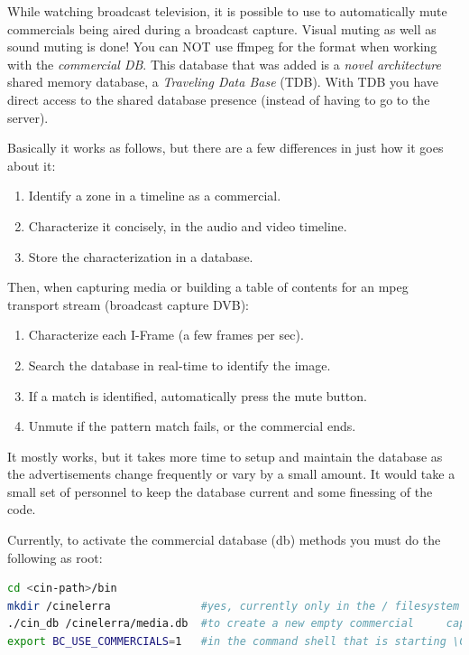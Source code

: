 While watching broadcast television, it is possible to use \CGG{} to automatically mute commercials being aired during a broadcast capture.  Visual muting as well as sound muting is done!  You can NOT use ffmpeg for the format when working with the \textit{commercial DB}.  This database that was added is a \textit{novel architecture} shared memory database, a \textit{Traveling Data Base} (TDB). With TDB you have direct access to the shared database presence (instead of having to go to the server).

Basically it works as follows, but there are a few differences in just how it goes about it:

\begin{enumerate}
    \item Identify a zone in a timeline as a commercial.
    \item Characterize it concisely, in the audio and video timeline.
    \item Store the characterization in a database.
\end{enumerate}

Then, when capturing media or building a table of contents for an mpeg transport stream (broadcast capture DVB):

\begin{enumerate}
    \item Characterize each I-Frame (a few frames per sec).
    \item Search the database in real-time to identify the image.
    \item If a match is identified, automatically press the mute button.
    \item Unmute if the pattern match fails, or the commercial ends.
\end{enumerate}

It mostly works, but it takes more time to setup and maintain the database as the advertisements change frequently or vary by a small amount.  It would take a small set of personnel to keep the database current and some finessing of the code.

Currently, to activate the commercial database (db) methods you must do the following as root:

\begin{lstlisting}[language=bash,numbers=none]
cd <cin-path>/bin
mkdir /cinelerra              #yes, currently only in the / filesystem
./cin_db /cinelerra/media.db  #to create a new empty commercial     capture database
export BC_USE_COMMERCIALS=1   #in the command shell that is starting \CGG{}
\end{lstlisting}

